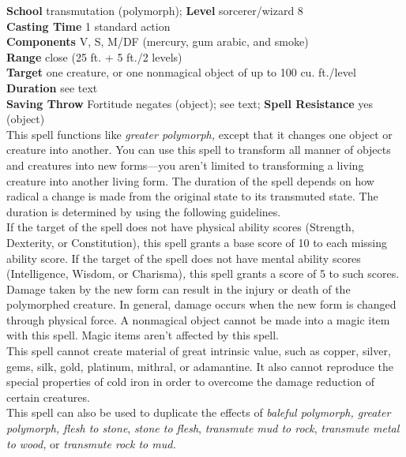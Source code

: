 \textbf{School} transmutation (polymorph); \textbf{Level} sorcerer/wizard 8\\
\textbf{Casting Time} 1 standard action\\
\textbf{Components} V, S, M/DF (mercury, gum arabic, and smoke)\\
\textbf{Range} close (25 ft. + 5 ft./2 levels)\\
\textbf{Target} one creature, or one nonmagical object of up to 100 cu. ft./level\\
\textbf{Duration} see text\\
\textbf{Saving Throw} Fortitude negates (object); see text; \textbf{Spell Resistance} yes (object)\\
This spell functions like \textit{greater polymorph, }except that it changes one object or creature into another. You can use this spell to transform all manner of objects and creatures into new forms—you aren't limited to transforming a living creature into another living form. The duration of the spell depends on how radical a change is made from the original state to its transmuted state. The duration is determined by using the following guidelines.\\
If the target of the spell does not have physical ability scores (Strength, Dexterity, or Constitution), this spell grants a base score of 10 to each missing ability score. If the target of the spell does not have mental ability scores (Intelligence, Wisdom, or Charisma)\textit{,} this spell grants a score of 5 to such scores. Damage taken by the new form can result in the injury or death of the polymorphed creature. In general, damage occurs when the new form is changed through physical force. A nonmagical object cannot be made into a magic item with this spell. Magic items aren't affected by this spell.\\
This spell cannot create material of great intrinsic value, such as copper, silver, gems, silk, gold, platinum, mithral, or adamantine. It also cannot reproduce the special properties of cold iron in order to overcome the damage reduction of certain creatures.\\
This spell can also be used to duplicate the effects of \textit{baleful polymorph, greater polymorph, flesh to stone}, \textit{stone to flesh}, \textit{transmute mud to rock}, \textit{transmute metal to wood, }or \textit{transmute rock to mud.}\\
